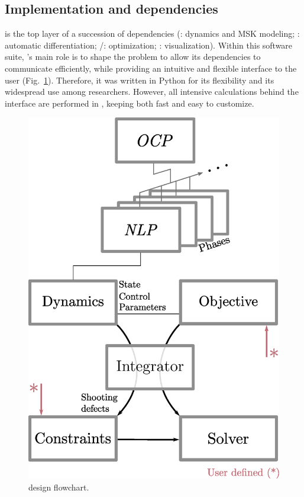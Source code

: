 \subsection{Implementation and dependencies}
\bioptim is the top layer of a succession of dependencies (\biorbd: dynamics and MSK modeling; \casadi: automatic differentiation; \ipopt/\acados: optimization; \bioviz: visualization).
Within this software suite, \bioptim 's main role is to shape the problem to allow its dependencies to communicate efficiently, while providing an intuitive and flexible interface to the user (Fig.~\ref{fig:dependencies}).
Therefore, it was written in Python for its flexibility and its widespread use among researchers.
However, all intensive calculations behind the interface are performed in , keeping \bioptim both fast and easy to customize.

\begin{figure}[t!]
\centering
\includegraphics[width=0.9\columnwidth]{figures/design.eps}
\caption{\bioptim design flowchart.}
\label{fig:dependencies}
\vspace*{-0.5cm}
\end{figure}


